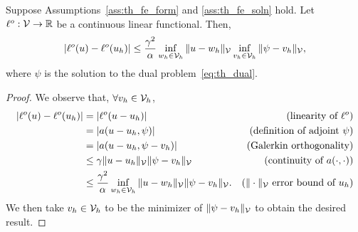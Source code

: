 \begin{proposition}
  \label{prop:th_output_nonsym}
   Suppose Assumptions~\eqref{ass:th_fe_form} and \eqref{ass:th_fe_soln} hold. Let $\ell^o: \mathcal{V} \to \mathbb{R}$ be a continuous linear functional.  Then,
\begin{equation*}
  |\ell^o(u) - \ell^o(u_h)|
  \leq \frac{\gamma^2}{\alpha} \inf_{w_h \in \mathcal{V}_h} \| u - w_h \|_{\mathcal{V}} \inf_{v_h \in \mathcal{V}_h} \| \psi - v_h \|_{\mathcal{V}},
\end{equation*}
where $\psi$ is the solution to the dual problem~\ref{eq:th_dual}.
\begin{proof}
  We observe that, $\forall v_h \in \mathcal{V}_h$, 
  \begin{align*}
    |\ell^o(u) - \ell^o(u_h)|
    &= |\ell^o(u - u_h)| & \text{(linearity of $\ell^o$)} \\
    &= |a(u-u_h,\psi)| & \text{(definition of adjoint $\psi$)} \\
    &= |a(u-u_h,\psi-v_h)| & \text{(Galerkin orthogonality)} \\
    &\leq \gamma \| u - u_h \|_{\mathcal{V}} \| \psi - v_h \|_{\mathcal{V}} & \text{(continuity of $a(\cdot,\cdot)$)} \\
    &\leq \frac{\gamma^2}{\alpha} \inf_{w_h \in \mathcal{V}_h} \| u - w_h \|_{\mathcal{V}} \| \psi - v_h \|_{\mathcal{V}}. & \text{($\| \cdot \|_{\mathcal{V}}$ error bound of $u_h$)}
  \end{align*}
  We then take $v_h \in \mathcal{V}_h$ to be the minimizer of $\| \psi - v_h \|_{\mathcal{V}}$ to obtain the desired result.
\end{proof}
\end{proposition}

